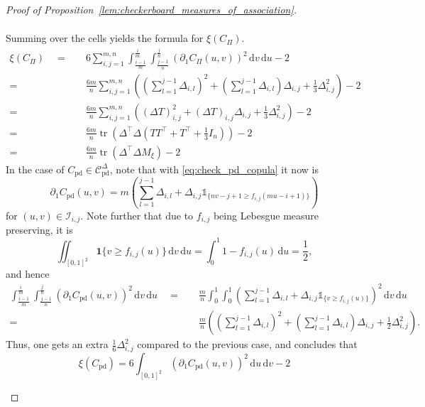 \documentclass{article}
\theoremstyle{definition}
\newcommand{\CC}{\mathcal{C}}  %
\newcommand{\II}{\mathcal{I}}  %
\DeclareMathOperator{\tr}{tr}  %
\def\1{\mathds{1}} %
\newcommand{\de}{\mathrm{\,d}}
\begin{document}
\begin{proof}[Proof of Proposition~\ref{lem:checkerboard_measures_of_association}]
\begin{enumerate}[label=(\roman*)]
\begin{align*}
        \end{align*}
        Summing over the cells yields the formula for $\xi(C_{\Pi})$.
        \begin{align*}
            \xi(C_{\Pi}) 
            \quad = \quad & 6 \sum_{i,j=1}^{m,n} \int_{\tfrac{i-1}{m}}^{\tfrac{i}{m}} \int_{\tfrac{j-1}{n}}^{\tfrac{j}{n}} \left(\partial_1 C_{\Pi}(u,v)\right)^2 \de v \de u - 2 \\
            = \quad & \frac{6m}{n} \sum_{i,j=1}^{m,n}\left(\left(\sum_{l=1}^{j-1}\Delta_{i,l}\right)^2 +\left(\sum_{l=1}^{j-1}\Delta_{i,l}\right)\Delta_{i,j} +\tfrac13\Delta_{i,j}^2 \right) -2 \\
            = \quad & \frac{6m}{n} \sum_{i,j=1}^{m,n} \left(\left(\Delta T\right)_{i,j}^2 + \left(\Delta T\right)_{i,j}\Delta_{i,j} +\tfrac13\Delta_{i,j}^2\right) - 2 \\
            = \quad & \frac{6m}{n} \tr\left(\Delta^\top \Delta \left( TT^\top + T^\top + \tfrac{1}{3}I_n\right)\right) - 2 \\
            = \quad & \frac{6m}{n} \tr\left(\Delta^\top \Delta M_{\xi}\right) - 2
        \end{align*}
        In the case of $C_{\text{pd}}\in\CC^{\Delta}_{\text{pd}}$, note that with \eqref{eq:check_pd_copula} it now is
        \[
            \partial_1 C_{\text{pd}}(u,v) 
            =m\left(\sum_{l=1}^{j-1}\Delta_{i,l} + \Delta_{i,j}\1_{\{nv-j+1\geq f_{i,j}(mu-i+1)\}}\right)
        \]
        for $(u,v)\in\II_{i,j}$.
        Note further that due to $f_{i,j}$ being Lebesgue measure preserving, it is
        \[
            \iint_{[0,1]^2} \mathbf{1}\{v \ge f_{i,j}(u)\}\de v \de u
            = \int_0^1 1 - f_{i,j}(u)\de u
            = \frac12
        ,\]
        and hence
        \begin{align*}
            \int_{\tfrac{i-1}{m}}^{\tfrac{i}{m}}\int_{\tfrac{j-1}{n}}^{\tfrac{j}{n}} \left(\partial_1 C_{\text{pd}}(u,v)\right)^2 \de v \de u
            \quad = \quad & \frac{m}n \int_0^1\int_0^1 \left(\sum_{l=1}^{j-1}\Delta_{i,l} + \Delta_{i,j}\1_{\{v\geq f_{i,j}(u)\}}\right)^2 \de v \de u \\	
            = \quad & \frac{m}{n}\left(\left(\sum_{l=1}^{j-1}\Delta_{i,l}\right)^2
            +\left(\sum_{l=1}^{j-1}\Delta_{i,l}\right)\Delta_{i,j}
            +\frac12\Delta_{i,j}^2 \right)
        .\end{align*}
        Thus, one gets an extra $\frac16 \Delta_{i,j}^2$ compared to the previous case, and concludes that
        \[
            \xi(C_{\text{pd}}) = 6 \int_{[0,1]^2} \left(\partial_1 C_{\text{pd}}(u,v)\right)^2 \de u\de v - 2
\]
\end{enumerate}
\end{proof}
\end{document}
